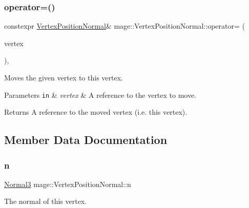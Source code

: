 \subsubsection{\texorpdfstring{operator=()}{operator=()}\hspace{0.1cm}{\footnotesize\ttfamily [2/2]}}
{\footnotesize\ttfamily constexpr \hyperlink{structmage_1_1_vertex_position_normal}{Vertex\+Position\+Normal}\& mage\+::\+Vertex\+Position\+Normal\+::operator= (\begin{DoxyParamCaption}\item[{\hyperlink{structmage_1_1_vertex_position_normal}{Vertex\+Position\+Normal} \&\&}]{vertex }\end{DoxyParamCaption})\hspace{0.3cm}{\ttfamily [default]}, {\ttfamily [noexcept]}}

Moves the given vertex to this vertex.


\begin{DoxyParams}[1]{Parameters}
\mbox{\tt in}  & {\em vertex} & A reference to the vertex to move. \\
\hline
\end{DoxyParams}
\begin{DoxyReturn}{Returns}
A reference to the moved vertex (i.\+e. this vertex). 
\end{DoxyReturn}


\subsection{Member Data Documentation}
\hypertarget{structmage_1_1_vertex_position_normal_a09baa618081e66e21cdfe5752dbf8df6}{}\label{structmage_1_1_vertex_position_normal_a09baa618081e66e21cdfe5752dbf8df6} 
\subsubsection{\texorpdfstring{n}{n}}
{\footnotesize\ttfamily \hyperlink{structmage_1_1_normal3}{Normal3} mage\+::\+Vertex\+Position\+Normal\+::n}

The normal of this vertex. \hypertarget{structmage_1_1_vertex_position_normal_ac95e9941363ec5687f0bf21e59b83940}{}\label{structmage_1_1_vertex_position_normal_ac95e9941363ec5687f0bf21e59b83940} 
